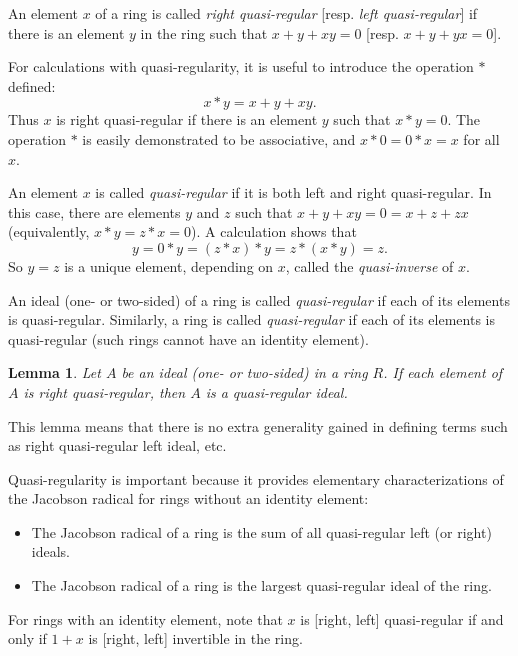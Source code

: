 \documentclass[12pt]{article}
\newtheorem*{lemma}{Lemma}
\begin{document}

An element $x$ of a ring is called \emph{right quasi-regular} [resp. \emph{left quasi-regular}] if there
is an element $y$ in the ring such that $x + y + xy = 0$ [resp. $x + y + yx = 0$].

For calculations with quasi-regularity, it is useful to introduce the operation $*$ defined:
$$ x * y = x + y + xy .$$
Thus $x$ is right quasi-regular if there is an element $y$ such that $x * y = 0$.
The operation $*$ is easily demonstrated to be associative, and $x * 0 = 0 * x = x$ for all $x$.

An element $x$ is called \emph{quasi-regular} if it is both left and right quasi-regular.
In this case, there are elements $y$ and $z$ such that $x + y + xy = 0 = x + z + zx$
(equivalently, $x * y = z * x = 0$).
A calculation shows that
$$y = 0 * y = (z * x) * y = z * (x * y) = z.$$
So $y = z$ is a unique element, depending on $x$, called the \emph{quasi-inverse} of $x$.

An ideal (one- or two-sided) of a ring is called \emph{quasi-regular} if each of its elements is quasi-regular.  Similarly, a ring is called \emph{quasi-regular} if each of its elements is quasi-regular (such rings cannot have an identity element).

\begin{lemma}
Let $A$ be an ideal (one- or two-sided) in a ring $R$.
If each element of $A$ is right quasi-regular, then $A$ is a quasi-regular ideal.
\end{lemma}

This lemma means that there is no extra generality gained in defining terms such as right quasi-regular left ideal, etc.

Quasi-regularity is important because it provides elementary characterizations of the Jacobson radical
for rings without an identity element:
\begin{itemize}
\item The Jacobson radical of a ring is the sum of all quasi-regular left (or right) ideals.
\item The Jacobson radical of a ring is the largest quasi-regular ideal of the ring.
\end{itemize}

For rings with an identity element, note that $x$ is [right, left] quasi-regular if and only if $1 + x$ is [right, left]
invertible in the ring.
\end{document}
